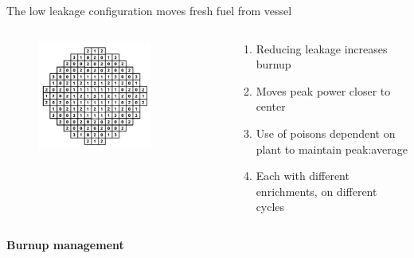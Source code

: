 \documentclass[aspectratio=1610,pdftex,dvipsnames,compress,xcolor={dvipsnames}]{beamer}
\begin{document}
\begin{frame}{The low leakage configuration moves fresh fuel from vessel}
    \begin{columns}

        \begin{column}{0.55\textwidth}
            \begin{figure}
                \centering
                \includegraphics[width=0.75\textwidth]{core_low.leak.jpg}
            \end{figure}
        \end{column}

        \begin{column}{0.45\textwidth}
            \begin{enumerate}[series=outerlist,topsep=0pt,itemsep=15pt,leftmargin=*,label=(\arabic*)]
                \item[]Reducing leakage increases burnup
                \item[]Moves peak power closer to center
                \item[]Use of poisons dependent on plant to maintain peak:average
                \item[]Each with different enrichments, on different cycles
            \end{enumerate}
        \end{column}

    \end{columns}
\end{frame}


\begin{frame}[plain]{}
    \centering\LARGE\textbf{Burnup management}
\end{frame}
\end{document}
